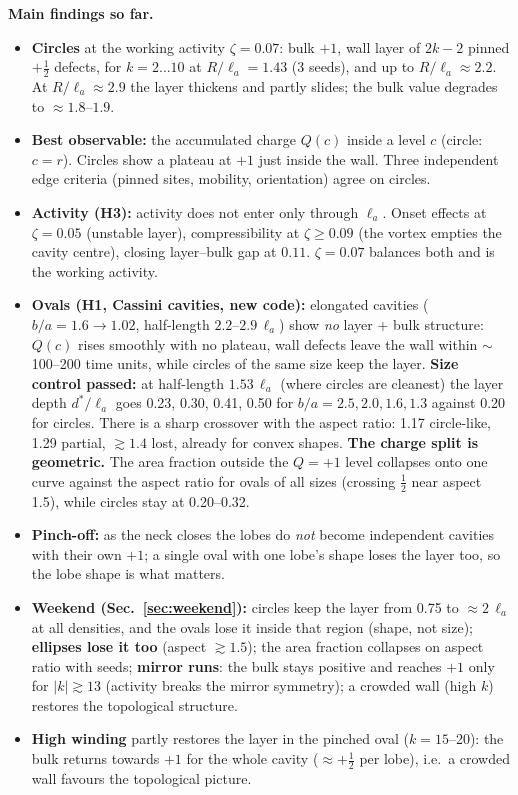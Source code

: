 \documentclass[11pt,a4paper]{article}
\newcommand{\la}{\ell_a}
\begin{document}
\textbf{Main findings so far.}
\begin{itemize}
  \item \textbf{Circles} at the working activity $\zeta=0.07$: bulk $+1$, wall layer of $2k-2$ pinned $+\tfrac12$
        defects, for $k=2\dots10$ at $R/\la=1.43$ (3 seeds), and up to $R/\la\approx 2.2$. At $R/\la\approx 2.9$ the
        layer thickens and partly slides; the bulk value degrades to $\approx 1.8$--$1.9$.
  \item \textbf{Best observable:} the accumulated charge $Q(c)$ inside a level $c$ (circle: $c=r$). Circles show a
        plateau at $+1$ just inside the wall. Three independent edge criteria (pinned sites, mobility, orientation)
        agree on circles.
  \item \textbf{Activity (H3):} activity does not enter only through $\la$. Onset effects at $\zeta=0.05$ (unstable layer),
        compressibility at $\zeta\ge0.09$ (the vortex empties the cavity centre), closing layer--bulk gap at $0.11$.
        $\zeta=0.07$ balances both and is the working activity.
  \item \textbf{Ovals (H1, Cassini cavities, new code):} elongated cavities ($b/a=1.6\to1.02$, half-length $2.2$--$2.9\,\la$)
        show \emph{no} layer + bulk structure: $Q(c)$ rises smoothly with no plateau, wall defects leave the wall within
        $\sim$100--200 time units, while circles of the same size keep the layer.
        \textbf{Size control passed:} at half-length $1.53\,\la$ (where circles are cleanest) the layer depth $d^*/\la$ goes
        0.23, 0.30, 0.41, 0.50 for $b/a=2.5, 2.0, 1.6, 1.3$ against 0.20 for circles. There is a sharp crossover with the
        aspect ratio: 1.17 circle-like, 1.29 partial, $\gtrsim1.4$ lost, already for convex shapes.
        \textbf{The charge split is geometric.} The area fraction outside the $Q=+1$ level collapses onto one curve
        against the aspect ratio for ovals of all sizes (crossing $\frac12$ near aspect 1.5), while circles stay at 0.20--0.32.
  \item \textbf{Pinch-off:} as the neck closes the lobes do \emph{not} become independent cavities with their own $+1$;
        a single oval with one lobe's shape loses the layer too, so the lobe shape is what matters.
  \item \textbf{Weekend (Sec.~\ref{sec:weekend}):} circles keep the layer from 0.75 to $\approx2\,\la$ at all densities, and
        the ovals lose it inside that region (shape, not size); \textbf{ellipses lose it too} (aspect $\gtrsim1.5$); the area
        fraction collapses on aspect ratio with seeds; \textbf{mirror runs}: the bulk stays positive and reaches $+1$ only for
        $|k|\gtrsim13$ (activity breaks the mirror symmetry); a crowded wall (high $k$) restores the topological structure.
  \item \textbf{High winding} partly restores the layer in the pinched oval ($k=15$--20): the bulk returns towards $+1$
        for the whole cavity ($\approx+\frac12$ per lobe), i.e.\ a crowded wall favours the topological picture.
\end{itemize}
\end{document}
